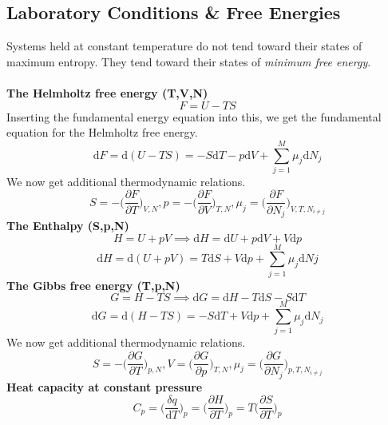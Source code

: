 \documentclass[8pt]{article}
\numberwithin{equation}{section}
\begin{document}
\begin{multicols}{2}
\section{Laboratory Conditions \& Free Energies}
Systems held at constant temperature do not tend toward their states of maximum entropy. They tend toward their states of \textit{minimum free energy}. \\ \\
\textbf{The Helmholtz free energy (T,V,N)} 
\begin{equation}
F=U-TS \tag{8.5}
\end{equation}
Inserting the fundamental energy equation into this, we get the fundamental equation for the Helmholtz free energy. 
\begin{equation}
\mathrm{d}F=\mathrm{d}(U-TS)=-S\mathrm{d}T-p\mathrm{d}V+\sum_{j=1}^{M}\mu_{j}\mathrm{d}N_{j} \tag{8.10}
\end{equation}
We now get additional thermodynamic relations. 
\begin{equation}
S=-\bigg( \frac{\partial F}{\partial T}\bigg)_{V,N}, p=-\bigg( \frac{\partial F}{\partial V} \bigg)_{T,N}, \mu_{j}=\bigg( \frac{\partial F}{\partial N_{j}} \bigg)_{V,T, N_{i\neq j}} \tag{8.12}
\end{equation}
\textbf{The Enthalpy (S,p,N)}
\begin{equation}
H=U+pV \implies \mathrm{d}H=\mathrm{d}U+p\mathrm{d}V+V\mathrm{d}p \tag{8.13}
\end{equation}
\begin{equation}
\mathrm{d}H=\mathrm{d}(U+pV)=T\mathrm{d}S+V\mathrm{d}p+\sum_{j=1}^{M}\mu_{j}\mathrm{d}N{j} \tag{8.15}
\end{equation}
\textbf{The Gibbs free energy (T,p,N)} 
\begin{equation}
G=H-TS \implies \mathrm{d} G=\mathrm{d}H-T\mathrm{d}S-S\mathrm{d}T \tag{8.16}
\end{equation}
\begin{equation}
\mathrm{d}G=\mathrm{d}(H-TS)=-S\mathrm{d}T+V\mathrm{d}p+\sum_{j=1}^{M}\mu_{j}\mathrm{d}N_{j} \tag{8.18}
\end{equation}
We now get additional thermodynamic relations. 
\begin{equation}
S=-\bigg( \frac{\partial G}{\partial T} \bigg)_{p,N}, V=\bigg( \frac{\partial G}{\partial p} \bigg)_{T,N}, \mu_{j}=\bigg( \frac{\partial G}{\partial N_{j}} \bigg)_{p,T, N_{i\neq j}} \tag{8.20}
\end{equation}
\textbf{Heat capacity at constant pressure}
\begin{equation}
C_p=\bigg( \frac{\delta q}{\mathrm{d} T} \bigg)_{p}=\bigg(\frac{\partial H}{\partial T} \bigg)_{p}=T\bigg(\frac{\partial S}{\partial T} \bigg)_{p}
\tag{8.25}
\end{equation}

\end{multicols}
\end{document}
